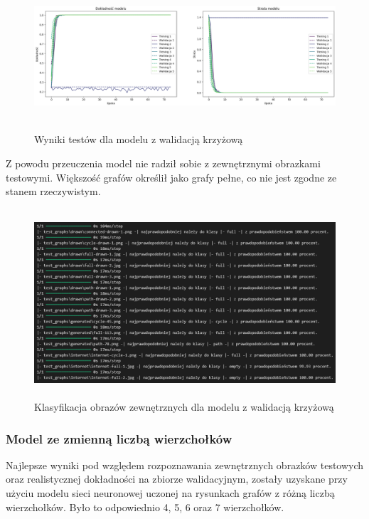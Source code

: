 \begin{figure}[ht]
	\centering
	\includegraphics[height=5.5cm]{partials/images/tests/v2_crossvalid.png}
	\caption{Wyniki testów dla modelu z walidacją krzyżową}
	\label{Fig:tests-cv-1}
\end{figure}
\FloatBarrier

Z powodu przeuczenia model nie radził sobie z zewnętrznymi obrazkami testowymi.
Większość grafów określił jako grafy pełne, co nie jest zgodne ze stanem rzeczywistym.

\begin{figure}[ht]
	\centering
	\includegraphics[height=7cm]{partials/images/tests/v2_crossvalid_img_tests.png}
	\caption{Klasyfikacja obrazów zewnętrznych dla modelu z walidacją krzyżową}
	\label{Fig:tests-cv-2}
\end{figure}
\FloatBarrier

\subsubsection{Model ze zmienną liczbą wierzchołków}
Najlepsze wyniki pod względem rozpoznawania zewnętrznych obrazków testowych
oraz realistycznej dokładności na zbiorze walidacyjnym,
zostały uzyskane przy użyciu modelu sieci neuronowej uczonej na rysunkach grafów z różną liczbą wierzchołków.
Było to odpowiednio 4, 5, 6 oraz 7 wierzchołków.


